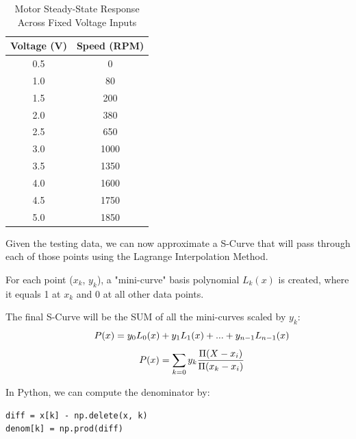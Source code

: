 \documentclass[letterpaper,twocolumn,fleqn]{article}
\begin{document}
\begin{table}[h!]
\centering
\begin{tabular}{|c|c|} %
\hline
\textbf{Voltage (V)} & \textbf{Speed (RPM)} \\ \hline
0.5 & 0 \\ \hline
1.0 & 80 \\ \hline
1.5 & 200 \\ \hline
2.0 & 380 \\ \hline
2.5 & 650 \\ \hline
3.0 & 1000 \\ \hline
3.5 & 1350 \\ \hline
4.0 & 1600 \\ \hline
4.5 & 1750 \\ \hline
5.0 & 1850 \\ \hline
\end{tabular}
\vspace{0.1in}
\caption{Motor Steady-State Response Across Fixed Voltage Inputs}
\end{table}

Given the testing data, we can now approximate a S-Curve that will pass through each of those points using the Lagrange Interpolation Method.
\vspace{0.1in}

\noindent For each point ($x_k$, $y_k$), a "mini-curve" basis polynomial $L_k(x)$ is created, where it equals 1 at $x_k$ and 0 at all other data points. 
\vspace{0.1in}

\noindent The final S-Curve will be the SUM of all the mini-curves scaled by $y_k$:
\[\hspace{0.4in}
P(x) = y_0L_0(x) + y_1L_1(x) + ... + y_{n-1}L_{n-1}(x)
\]
\[\hspace{0.4in}
P(x) = \sum_{k=0}y_k\frac{\Pi(X-x_i)}{\Pi(x_k-x_i)}
\]

\noindent In Python, we can compute the denominator by:
\vspace{0.1in}

\begin{center}
\begin{minipage}{0.75\linewidth} %
\begin{verbatim}
diff = x[k] - np.delete(x, k)
denom[k] = np.prod(diff)
\end{verbatim}
\end{minipage}
\end{center}
\end{document}
